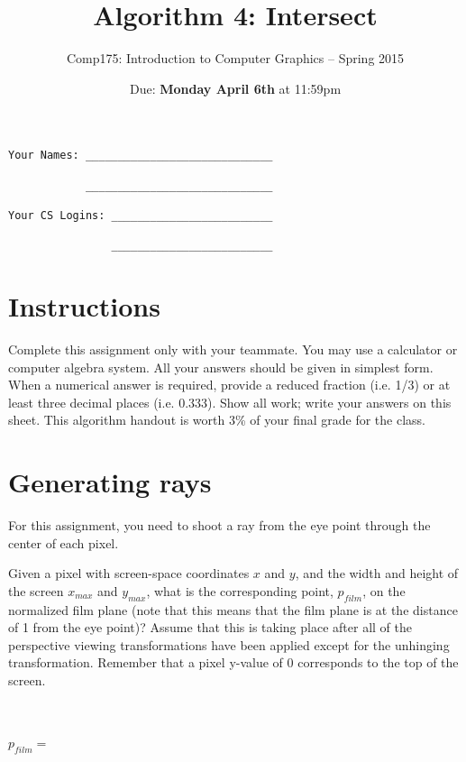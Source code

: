 \documentclass[10pt,twocolumn]{article}
\title{\Huge{\bf Algorithm 4: Intersect}}
\author{Comp175: Introduction to Computer Graphics -- Spring 2015}
\date{Due:  {\bf Monday April 6th} at 11:59pm}                                           %
\begin{document}
\maketitle

\begin{verbatim}
Your Names: _____________________________

            _____________________________

Your CS Logins: _________________________

                _________________________
\end{verbatim}

\section{Instructions}
Complete this assignment only with your teammate. You may use a calculator or computer algebra system. All your answers should be given in simplest form. When a numerical answer is required, provide a reduced fraction (i.e. 1/3) or at least three decimal places (i.e. 0.333). Show all work; write your answers on this sheet. This algorithm handout is worth 3\% of your final grade for the class.

\section{Generating rays}
For this assignment, you need to shoot a ray from the eye point through the center of each pixel.

\begin{framed}
\noindent {\bf [1 point]} Given a pixel with screen-space coordinates $x$ and $y$, and the width and height of the screen $x_{max}$ and $y_{max}$, what is the corresponding point, $p_{film}$, on the normalized film plane (note that this means that the film plane is at the distance of 1 from the eye point)? Assume that this is taking place after all of the perspective viewing transformations have been applied except for the unhinging transformation. Remember that a pixel y-value of 0 corresponds to the top of the screen.\\\\\\\\
$p_{film} =$\\\\\\
\end{framed}
\end{document}
